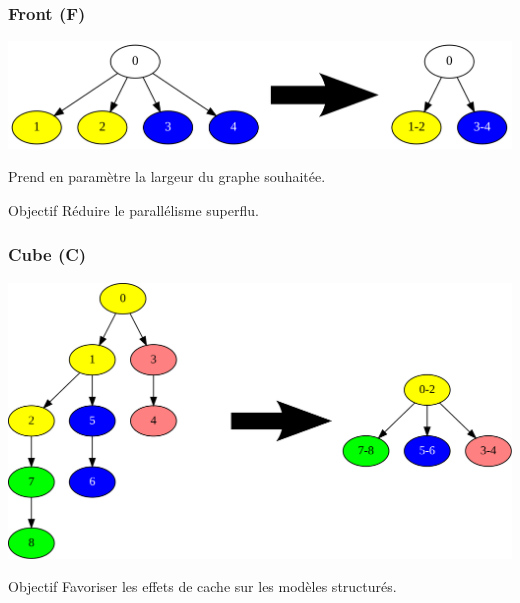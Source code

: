 \documentclass{beamer}
\begin{document}
\begin{frame}
  \frametitle{Front (F)}

  \centerline{\includegraphics[width=0.80\linewidth]{algo_F2}}

  \bigskip
  \bigskip

  Prend en paramètre la largeur du graphe souhaitée.

  \bigskip

  \begin{block}{Objectif}
    Réduire le parallélisme superflu.
  \end{block}
\end{frame}


\begin{frame}
  \frametitle{Cube (C)}

  \centerline{\includegraphics[width=0.80\linewidth]{algo_3}}

  \begin{block}{Objectif}
    Favoriser les effets de cache sur les modèles structurés.
  \end{block}
\end{frame}
\end{document}
